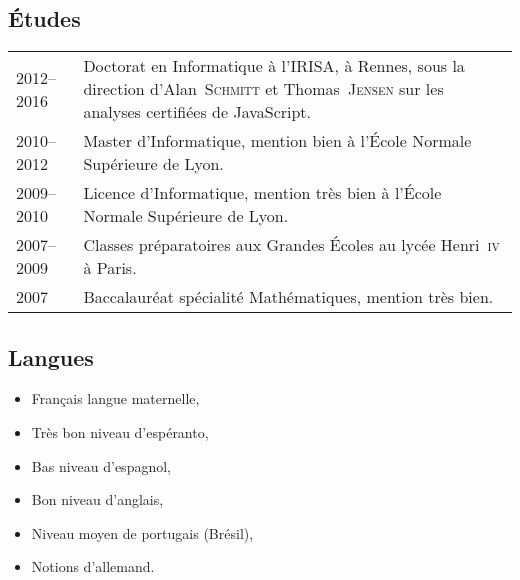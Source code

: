 \documentclass[12pt,a4paper]{article}
\makeatletter
\newenvironment{datecvsection}[1]%
               {\subsection*{#1}%
                 \noindent \begin{tabular}{@{}p{\annee}p{\texte}@{}}}
               {\end{tabular}}
\newenvironment{cvsection}[1]%
               {\subsection*{#1}}
               {}
\newcommand\familyName{\textsc}
\newcommand\placeName{}
\makeatother
\begin{document}
\begin{datecvsection}{Études}

    2012–2016 & Doctorat en Informatique à l’\placeName{IRISA}, à \placeName{Rennes}, sous la direction d’Alan~\familyName{Schmitt} et Thomas~\familyName{Jensen} sur les analyses certifiées de JavaScript. \\

	2010–2012 & Master d’Informatique, mention bien à l’École Normale Supérieure de \placeName{Lyon}. \\

	2009–2010 & Licence d’Informatique, mention très bien à l’École Normale Supérieure de \placeName{Lyon}. \\

    2007–2009 & Classes préparatoires aux Grandes Écoles au lycée \placeName{Henri~\textsc{iv}} à \placeName{Paris}. \\

	2007 & Baccalauréat spécialité Mathématiques, mention très bien. \\

\end{datecvsection}

\begin{cvsection}{Langues}
\parbox{.4\textwidth}{
\begin{itemize}
   \item Français langue maternelle,
   \item Très bon niveau d’espéranto,
   \item Bas niveau d’espagnol,
\end{itemize}}
\parbox{.5\textwidth}{
\begin{itemize}
   \item Bon niveau d’anglais,
	 \item Niveau moyen de portugais (Brésil),
   \item Notions d’allemand.
\end{itemize}
}
\end{cvsection}
\end{document}
